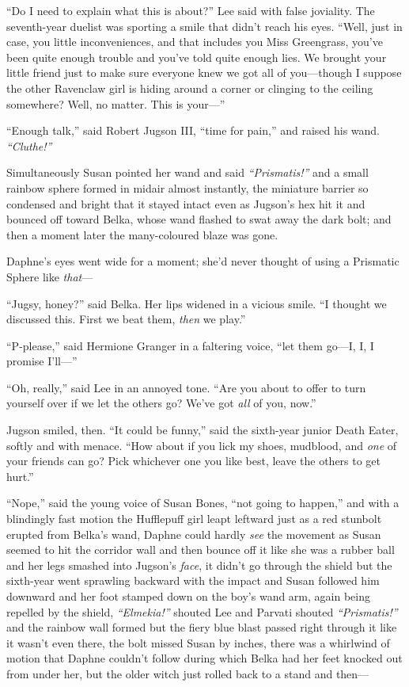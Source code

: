``Do I need to explain what this is about?'' Lee said with false
joviality. The seventh-year duelist was sporting a smile that didn't
reach his eyes. ``Well, just in case, you little inconveniences, and
that includes you Miss Greengrass, you've been quite enough trouble and
you've told quite enough lies. We brought your little friend just to
make sure everyone knew we got all of you---though I suppose the other
Ravenclaw girl is hiding around a corner or clinging to the ceiling
somewhere? Well, no matter. This is your---''

``Enough talk,'' said Robert Jugson III, ``time for pain,'' and raised
his wand. \emph{``Cluthe!''}

Simultaneously Susan pointed her wand and said \emph{``Prismatis!''} and
a small rainbow sphere formed in midair almost instantly, the miniature
barrier so condensed and bright that it stayed intact even as Jugson's
hex hit it and bounced off toward Belka, whose wand flashed to swat away
the dark bolt; and then a moment later the many-coloured blaze was gone.

Daphne's eyes went wide for a moment; she'd never thought of using a
Prismatic Sphere like \emph{that}---

``Jugsy, honey?'' said Belka. Her lips widened in a vicious smile. ``I
thought we discussed this. First we beat them, \emph{then} we play.''

``P-please,'' said Hermione Granger in a faltering voice, ``let them
go---I, I, I promise I'll---''

``Oh, really,'' said Lee in an annoyed tone. ``Are you about to offer to
turn yourself over if we let the others go? We've got \emph{all} of you,
now.''

Jugson smiled, then. ``It could be funny,'' said the sixth-year junior
Death Eater, softly and with menace. ``How about if you lick my shoes,
mudblood, and \emph{one} of your friends can go? Pick whichever one you
like best, leave the others to get hurt.''

``Nope,'' said the young voice of Susan Bones, ``not going to happen,''
and with a blindingly fast motion the Hufflepuff girl leapt leftward
just as a red stunbolt erupted from Belka's wand, Daphne could hardly
\emph{see} the movement as Susan seemed to hit the corridor wall and
then bounce off it like she was a rubber ball and her legs smashed into
Jugson's \emph{face}, it didn't go through the shield but the sixth-year
went sprawling backward with the impact and Susan followed him downward
and her foot stamped down on the boy's wand arm, again being repelled by
the shield, \emph{``Elmekia!''} shouted Lee and Parvati shouted
\emph{``Prismatis!''} and the rainbow wall formed but the fiery blue
blast passed right through it like it wasn't even there, the bolt missed
Susan by inches, there was a whirlwind of motion that Daphne couldn't
follow during which Belka had her feet knocked out from under her, but
the older witch just rolled back to a stand and then---


